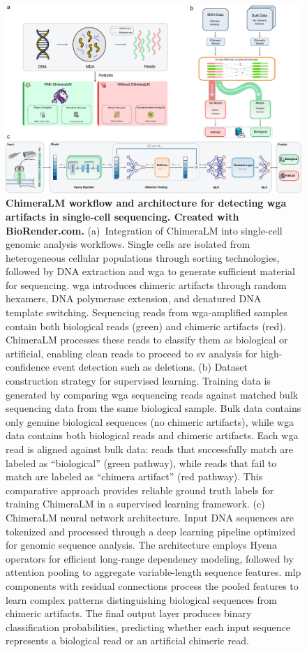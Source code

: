 \documentclass[pdflatex,sn-nature]{sn-jnl}%
\theoremstyle{thmstyleone}%
\theoremstyle{thmstyletwo}%
\theoremstyle{thmstylethree}%
\begin{document}
\begin{figure}[p]
	\begin{center}
		\includegraphics[width=\textwidth]{final_figures/figure1}
	\end{center}
	\caption{{\bf ChimeraLM workflow and architecture for detecting \gls{wga} artifacts in single-cell sequencing. Created with BioRender.com.}
		(a)~Integration of ChimeraLM into single-cell genomic analysis workflows. Single cells are isolated from heterogeneous cellular populations through sorting technologies, followed by DNA extraction and \gls{wga} to generate sufficient material for sequencing. \gls{wga} introduces chimeric artifacts through random hexamers, DNA polymerase extension, and denatured DNA template switching. Sequencing reads from \gls{wga}-amplified samples contain both biological reads (green) and chimeric artifacts (red). ChimeraLM processes these reads to classify them as biological or artificial, enabling clean reads to proceed to \gls{sv} analysis for high-confidence event detection such as deletions.
		(b) Dataset construction strategy for supervised learning. Training data is generated by comparing \gls{wga} sequencing reads against matched bulk sequencing data from the same biological sample. Bulk data contains only genuine biological sequences (no chimeric artifacts), while \gls{wga} data contains both biological reads and chimeric artifacts. Each \gls{wga} read is aligned against bulk data: reads that successfully match are labeled as ``biological'' (green pathway), while reads that fail to match are labeled as ``chimera artifact'' (red pathway). This comparative approach provides reliable ground truth labels for training ChimeraLM in a supervised learning framework.
		(c) ChimeraLM neural network architecture. Input DNA sequences are tokenized and processed through a deep learning pipeline optimized for genomic sequence analysis. The architecture employs Hyena operators for efficient long-range dependency modeling, followed by attention pooling to aggregate variable-length sequence features. \gls{mlp} components with residual connections process the pooled features to learn complex patterns distinguishing biological sequences from chimeric artifacts. The final output layer produces binary classification probabilities, predicting whether each input sequence represents a biological read or an artificial chimeric read.
}
\end{figure}
\end{document}

